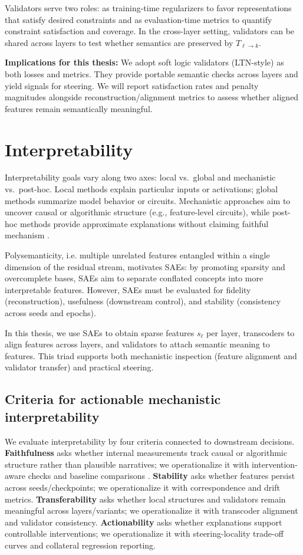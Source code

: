 \documentclass[../ppgc-tese.tex]{subfiles}
\begin{document}
Validators serve two roles: as training-time regularizers to favor representations that satisfy desired constraints and as evaluation-time metrics to quantify constraint satisfaction and coverage. In the cross-layer setting, validators can be shared across layers to test whether semantics are preserved by $T_{\ell\to k}$.

\textbf{Implications for this thesis:} We adopt soft logic validators (LTN-style) as both losses and metrics. They provide portable semantic checks across layers and yield signals for steering. We will report satisfaction rates and penalty magnitudes alongside reconstruction/alignment metrics to assess whether aligned features remain semantically meaningful.

\section{Interpretability}
Interpretability goals vary along two axes: local vs.~global and mechanistic vs.~post-hoc. Local methods explain particular inputs or activations; global methods summarize model behavior or circuits. Mechanistic approaches aim to uncover causal or algorithmic structure (e.g., feature-level circuits), while post-hoc methods provide approximate explanations without claiming faithful mechanism \cite{doshi2017rigorous,jacovi2020faithfulness}.

Polysemanticity, i.e. multiple unrelated features entangled within a single dimension of the residual stream, motivates SAEs: by promoting sparsity and overcomplete bases, SAEs aim to separate conflated concepts into more interpretable features. However, SAEs must be evaluated for fidelity (reconstruction), usefulness (downstream control), and stability (consistency across seeds and epochs).

In this thesis, we use SAEs to obtain sparse features $s_\ell$ per layer, transcoders to align features across layers, and validators to attach semantic meaning to features. This triad supports both mechanistic inspection (feature alignment and validator transfer) and practical steering.

\subsection{Criteria for actionable mechanistic interpretability}
We evaluate interpretability by four criteria connected to downstream decisions. \textbf{Faithfulness} asks whether internal measurements track causal or algorithmic structure rather than plausible narratives; we operationalize it with intervention-aware checks and baseline comparisons \cite{jacovi2020faithfulness}. \textbf{Stability} asks whether features persist across seeds/checkpoints; we operationalize it with correspondence and drift metrics. \textbf{Transferability} asks whether local structures and validators remain meaningful across layers/variants; we operationalize it with transcoder alignment and validator consistency. \textbf{Actionability} asks whether explanations support controllable interventions; we operationalize it with steering-locality trade-off curves and collateral regression reporting.
\end{document}
